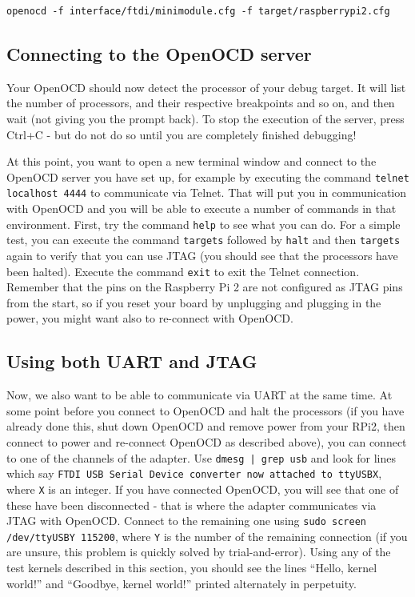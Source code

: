 \documentclass[a4paper,11pt,reqno]{amsart}
\begin{document}
{\begin{verbatim}
openocd -f interface/ftdi/minimodule.cfg -f target/raspberrypi2.cfg
\end{verbatim}

\subsection{Connecting to the OpenOCD server}
Your OpenOCD should now detect the processor of your debug target. It will list the number of processors, and their respective breakpoints and so on, and then wait (not giving you the prompt back). To stop the execution of the server, press Ctrl+C - but do not do so until you are completely finished debugging!

At this point, you want to open a new terminal window and connect to the OpenOCD server you have set up, for example by executing the command \texttt{telnet localhost 4444} to communicate via Telnet. That will put you in communication with OpenOCD and you will be able to execute a number of commands in that environment. First, try the command \texttt{help} to see what you can do. For a simple test, you can execute the command \texttt{targets} followed by \texttt{halt} and then \texttt{targets} again to verify that you can use JTAG (you should see that the processors have been halted). Execute the command \texttt{exit} to exit the Telnet connection. Remember that the pins on the Raspberry Pi 2 are not configured as JTAG pins from the start, so if you reset your board by unplugging and plugging in the power, you might want also to re-connect with OpenOCD.

\subsection{Using both UART and JTAG}
Now, we also want to be able to communicate via UART at the same time. At some point before you connect to OpenOCD and halt the processors (if you have already done this, shut down OpenOCD and remove power from your RPi2, then connect to power and re-connect OpenOCD as described above), you can connect to one of the channels of the adapter. Use \texttt{dmesg | grep usb} and look for lines which say \texttt{FTDI USB Serial Device converter now attached to ttyUSBX}, where \texttt{X} is an integer. If you have connected OpenOCD, you will see that one of these have been disconnected - that is where the adapter communicates via JTAG with OpenOCD. Connect to the remaining one using \texttt{sudo screen /dev/ttyUSBY 115200}, where \texttt{Y} is the number of the remaining connection (if you are unsure, this problem is quickly solved by trial-and-error). Using any of the test kernels described in this section, you should see the lines ``Hello, kernel world!'' and ``Goodbye, kernel world!'' printed alternately in perpetuity.

}
\end{document}
